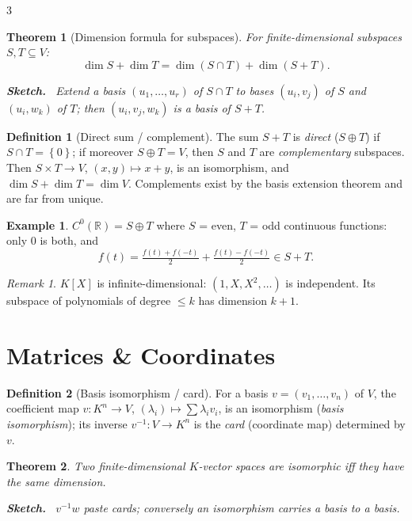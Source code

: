 \documentclass[10pt,a4paper,landscape]{article}
\theoremstyle{definition}
\newtheorem{defn}{Definition}[section]
\newtheorem{exm}{Example}[section]
\theoremstyle{plain}
\newtheorem{thm}{Theorem}[section]
\theoremstyle{remark}
\newtheorem{rem}{Remark}[section]
\newcommand{\R}{\mathbb{R}}
\newcommand{\set}[1]{\left\{ #1 \right\}}
\newcommand{\dsum}{\oplus}
\newenvironment{proofsketch}{%
  \par\small\color{exgray}\textbf{Sketch.}\ }%
  {\par}
\begin{document}
\begin{multicols*}{3}
\begin{thm}[Dimension formula for subspaces]
For finite-dimensional subspaces $S, T \subseteq V$:
\[
\dim S + \dim T = \dim(S \cap T) + \dim(S + T).
\]
\begin{proofsketch}
Extend a basis $(u_1, \dots, u_r)$ of $S \cap T$ to bases $(u_i, v_j)$ of $S$ and $(u_i, w_k)$ of $T$; then $(u_i, v_j, w_k)$ is a basis of $S + T$.
\end{proofsketch}
\end{thm}

\begin{defn}[Direct sum / complement]
The sum $S + T$ is \emph{direct} ($S \dsum T$) if $S \cap T = \set{0}$; if moreover $S \dsum T = V$, then $S$ and $T$ are \emph{complementary} subspaces. Then $S \times T \to V$, $(x,y) \mapsto x+y$, is an isomorphism, and $\dim S + \dim T = \dim V$. Complements exist by the basis extension theorem and are far from unique.
\end{defn}

\begin{exm}
$C^0(\R) = S \dsum T$ where $S$ = even, $T$ = odd continuous functions: only $0$ is both, and
\[
f(t) = \tfrac{f(t)+f(-t)}{2} + \tfrac{f(t)-f(-t)}{2} \in S + T.
\]
\end{exm}

\begin{rem}
$K[X]$ is infinite-dimensional: $(1, X, X^2, \dots)$ is independent. Its subspace of polynomials of degree $\le k$ has dimension $k+1$.
\end{rem}

\section{Matrices \& Coordinates}

\begin{defn}[Basis isomorphism / card]
For a basis $v = (v_1, \dots, v_n)$ of $V$, the coefficient map $v: K^n \to V$, $(\lambda_i) \mapsto \sum \lambda_i v_i$, is an isomorphism (\emph{basis isomorphism}); its inverse $v^{-1}: V \to K^n$ is the \emph{card} (coordinate map) determined by $v$.
\end{defn}

\begin{thm}
Two finite-dimensional $K$-vector spaces are isomorphic iff they have the same dimension.
\begin{proofsketch}
$v^{-1} w$ paste cards; conversely an isomorphism carries a basis to a basis.
\end{proofsketch}
\end{thm}


\end{multicols*}
\end{document}
